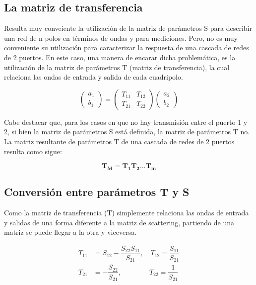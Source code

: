 \subsection{La matriz de transferencia} \label{ssec:transMatrix}

Resulta muy conveiente la utilización de la matriz de parámetros S para describir una red de n polos en términos de ondas y
para mediciones. Pero, no es muy conveniente su utilización para caracterizar la respuesta de una cascada de redes de 2
puertos. En este caso, una manera de encarar dicha problemática, es la utilización de la matriz de parámetros T (matriz
de transferencia), la cual relaciona las ondas de entrada y salida de cada cuadripolo.

\begin{equation}
\begin{pmatrix} a_1\\b_1 \end{pmatrix} = \begin{pmatrix} T_{11} & T_{12}\\T_{21} & T_{22} \end{pmatrix}
\begin{pmatrix} a_2\\b_2 \end{pmatrix}
\end{equation}

Cabe destacar que, para los casos en que no hay transmisión entre el puerto 1 y 2, si bien la matriz de parámetros S está definida,
la matriz de parámetros T no. La matriz resultante de parámetros T de una cascada de redes de 2 puertos resulta como sigue:

\begin{equation}
\mathbf{T_M=T_1T_2...T_m}
\label{eq:cascade}
\end{equation}

\subsection{Conversión entre parámetros T y S} \label{ssec:conversion}

Como la matriz de transferencia (T) simplemente relaciona las ondas de entrada y salidas de una forma diferente a la matriz de
scattering, partiendo de una matriz se puede llegar a la otra y viceversa.

\begin{equation}
	\begin{aligned}
		T_{11} &= S_{12} - \dfrac{S_{22}S_{11}}{S_{21}},\quad T_{12} = \dfrac{S_{11}}{S_{21}} \\
		T_{21} &= - \dfrac{S_{22}}{S_{21}},\qquad\qquad T_{22} = \dfrac{1}{S_{21}}
	\end{aligned}
	\label{eq:s2t}
\end{equation}

